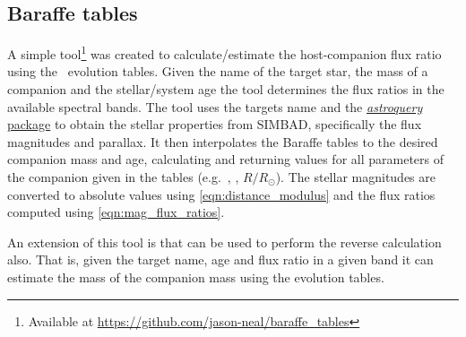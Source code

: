 \subsection{Baraffe tables}
\label{subsubsec:baraffe_tables_code}
A simple tool\footnote{Available at \href{https://github.com/jason-neal/baraffe_tables}{https://github.com/jason-neal/baraffe\_tables}} was created to calculate/estimate the host-companion flux ratio using the~\citet{baraffe_evolutionary_2003, baraffe_new_2015} evolution tables.
Given the name of the target star, the mass of a companion and the stellar/system age the tool determines the flux ratios in the available spectral bands.
The tool uses the targets name and the \href{https://zenodo.org/record/1160627}{\emph{astroquery} package} to obtain the stellar properties from {SIMBAD}, specifically the flux magnitudes and parallax.
It then interpolates the Baraffe tables to the desired companion mass and age, calculating and returning values for all parameters of the companion given in the tables (e.g.\ \Teff{}, \Logg{}, \(R/R_{\odot}\)).
The stellar magnitudes are converted to absolute values using \cref{eqn:distance_modulus} and the flux ratios computed using \cref{eqn:mag_flux_ratios}.

An extension of this tool is that can be used to perform the reverse calculation also.
That is, given the target name, age and flux ratio in a given band it can estimate the mass of the companion mass using the evolution tables.
